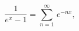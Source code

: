 \begin{equation}
\frac{1}{e^{x}-1}=\sum _{n=1}^{\infty }\, e^{-nx},\label{Denominator}\end{equation}

